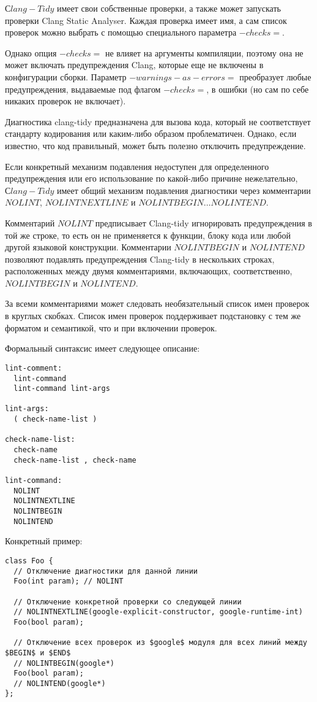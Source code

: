 \documentclass{mipt-thesis-bs}
\begin{document}
$Сlang-Tidy$ имеет свои собственные проверки, а также может запускать 
проверки Clang Static Analyser. Каждая проверка имеет имя, 
а сам список проверок можно выбрать с помощью специального параметра $-checks=$.

Однако опция $-checks=$ не влияет на аргументы компиляции, поэтому она 
не может включать предупреждения Clang, которые еще не включены в 
конфигурации сборки. Параметр $-warnings-as-errors=$ преобразует 
любые предупреждения, выдаваемые под флагом $-checks=$, в ошибки 
(но сам по себе никаких проверок не включает).

Диагностика clang-tidy предназначена для вызова кода, который не 
соответствует стандарту кодирования или каким-либо образом проблематичен. 
Однако, если известно, что код правильный, может быть полезно отключить предупреждение.

Если конкретный механизм подавления недоступен для определенного 
предупреждения или его использование по какой-либо причине 
нежелательно, $Сlang-Tidy$ имеет общий механизм подавления 
диагностики через комментарии $NOLINT$, $NOLINTNEXTLINE$ и $NOLINTBEGIN… NOLINTEND$.

Комментарий $NOLINT$ предписывает Clang-tidy игнорировать предупреждения 
в той же строке, то есть он не применяется к функции, блоку кода или любой 
другой языковой конструкции.
Комментарии $NOLINTBEGIN$ и $NOLINTEND$ позволяют подавлять предупреждения 
Clang-tidy в нескольких строках, расположенных между двумя 
комментариями, включающих, соответственно, $NOLINTBEGIN$ и $NOLINTEND$.

За всеми комментариями может следовать необязательный список имен 
проверок в круглых скобках. 
Список имен проверок поддерживает подстановку с тем же форматом 
и семантикой, что и при включении проверок.

Формальный синтаксис имеет следующее описание:
\begin{verbatim}
lint-comment:
  lint-command
  lint-command lint-args

lint-args:
  ( check-name-list )

check-name-list:
  check-name
  check-name-list , check-name

lint-command:
  NOLINT
  NOLINTNEXTLINE
  NOLINTBEGIN
  NOLINTEND
\end{verbatim}

Конкретный пример:
\begin{verbatim}
class Foo {
  // Отключение диагностики для данной линии
  Foo(int param); // NOLINT

  // Отключение конкретной проверки со следующей линии
  // NOLINTNEXTLINE(google-explicit-constructor, google-runtime-int)
  Foo(bool param);

  // Отключение всех проверок из $google$ модуля для всех линий между $BEGIN$ и $END$
  // NOLINTBEGIN(google*)
  Foo(bool param);
  // NOLINTEND(google*)
};
\end{verbatim}
\end{document}
